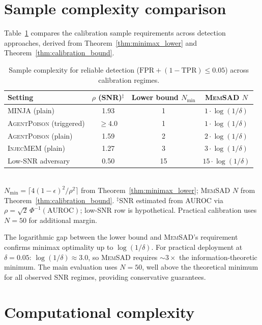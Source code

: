 \documentclass{article}
\theoremstyle{definition}
\newcommand{\tpr}{\text{TPR}}
\newcommand{\fpr}{\text{FPR}}
\newcommand{\memsad}{\textnormal{\textsc{MemSAD}}}
\newcommand{\agentpoison}{\textsc{AgentPoison}}
\newcommand{\minja}{\textsc{MINJA}}
\newcommand{\injecmem}{\textsc{InjecMEM}}
\begin{document}
\section{Sample complexity comparison}
\label{app:sample_complexity}

Table~\ref{tab:sample_complexity} compares the calibration sample requirements across detection approaches, derived from Theorem~\ref{thm:minimax_lower} and Theorem~\ref{thm:calibration_bound}.

\begin{table}[ht]
  \centering
  \small
  \caption{Sample complexity for reliable detection ($\fpr + (1 - \tpr) \leq 0.05$) across calibration regimes.}
  \label{tab:sample_complexity}
  \vspace{2pt}
  \begin{tabular}{l c c c}
    \toprule
    Setting & $\rho$ (SNR)$^\ddagger$ & Lower bound $N_{\min}$ & \memsad{} $N$ \\
    \midrule
    \minja{} (plain) & 1.93 & 1 & $1 \cdot \log(1/\delta)$ \\
    \agentpoison{} (triggered) & $\geq 4.0$ & 1 & $1 \cdot \log(1/\delta)$ \\
    \agentpoison{} (plain) & 1.59 & 2 & $2 \cdot \log(1/\delta)$ \\
    \injecmem{} (plain) & 1.27 & 3 & $3 \cdot \log(1/\delta)$ \\
    Low-SNR adversary & 0.50 & 15 & $15 \cdot \log(1/\delta)$ \\
    \bottomrule
  \end{tabular}
  \\[2pt]
  {\footnotesize $N_{\min} = \lceil 4(1-\epsilon)^2/\rho^2 \rceil$ from Theorem~\ref{thm:minimax_lower}; \memsad{} $N$ from Theorem~\ref{thm:calibration_bound}. $^\ddagger$SNR estimated from AUROC via $\rho = \sqrt{2}\,\Phi^{-1}(\text{AUROC})$; low-SNR row is hypothetical. Practical calibration uses $N = 50$ for additional margin.}
\end{table}

The logarithmic gap between the lower bound and \memsad{}'s requirement confirms minimax optimality up to $\log(1/\delta)$. For practical deployment at $\delta = 0.05$: $\log(1/\delta) \approx 3.0$, so \memsad{} requires $\sim 3\times$ the information-theoretic minimum. The main evaluation uses $N = 50$, well above the theoretical minimum for all observed SNR regimes, providing conservative guarantees.

\section{Computational complexity}
\label{app:complexity}
\end{document}
